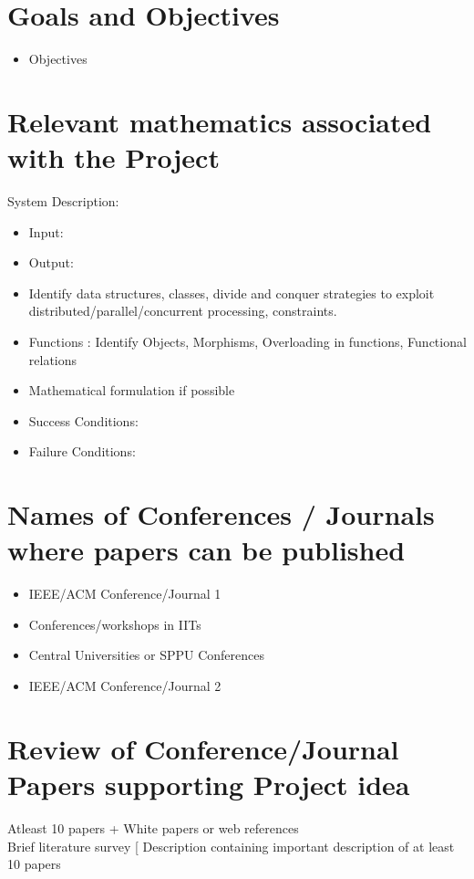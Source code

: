 \documentclass[oneside,a4paper,12pt]{report}
\begin{document}
\section{Goals and Objectives}
\begin{itemize}
	\item Objectives
\end{itemize}


\section{Relevant mathematics associated with the Project}
\label{sec:math}
System Description:
\begin{itemize}
\item Input:
\item Output:
\item Identify data structures, classes, divide and conquer strategies to exploit distributed/parallel/concurrent processing, constraints.
\item Functions : Identify Objects, Morphisms, Overloading in functions, Functional relations
\item Mathematical formulation if possible
\item Success Conditions:
\item Failure Conditions:
\end{itemize}


\section{Names of Conferences / Journals where papers can be published}
\begin{itemize}
\item  IEEE/ACM Conference/Journal 1
\item  Conferences/workshops in IITs
\item  Central Universities or SPPU Conferences
\item IEEE/ACM Conference/Journal 2
\end{itemize}


\section{Review of Conference/Journal Papers supporting Project idea}
\label{sec:survey}
   Atleast 10 papers + White papers or web references\\
   Brief literature survey [ Description containing important description of at least 10 papers
\end{document}
